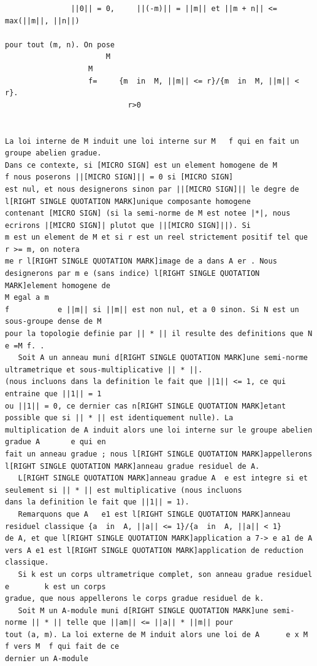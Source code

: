 \documentclass[
  11pt,
]{article}
\begin{document}
\begin{lstlisting}
               ||0|| = 0,     ||(-m)|| = ||m|| et ||m + n|| <= max(||m||, ||n||)

pour tout (m, n). On pose
                       M
                   M
                   f=     {m  in  M, ||m|| <= r}/{m  in  M, ||m|| < r}.
                            r>0


La loi interne de M induit une loi interne sur M   f qui en fait un groupe abelien gradue.
Dans ce contexte, si [MICRO SIGN] est un element homogene de M          f nous poserons ||[MICRO SIGN]|| = 0 si [MICRO SIGN]
est nul, et nous designerons sinon par ||[MICRO SIGN]|| le degre de l[RIGHT SINGLE QUOTATION MARK]unique composante homogene
contenant [MICRO SIGN] (si la semi-norme de M est notee |*|, nous ecrirons |[MICRO SIGN]| plutot que ||[MICRO SIGN]||). Si
m est un element de M et si r est un reel strictement positif tel que r >= m, on notera
me r l[RIGHT SINGLE QUOTATION MARK]image de a dans A er . Nous designerons par m e (sans indice) l[RIGHT SINGLE QUOTATION MARK]element homogene de
M egal a m
f           e ||m|| si ||m|| est non nul, et a 0 sinon. Si N est un sous-groupe dense de M
pour la topologie definie par || * || il resulte des definitions que N e =M f. .
   Soit A un anneau muni d[RIGHT SINGLE QUOTATION MARK]une semi-norme ultrametrique et sous-multiplicative || * ||.
(nous incluons dans la definition le fait que ||1|| <= 1, ce qui entraine que ||1|| = 1
ou ||1|| = 0, ce dernier cas n[RIGHT SINGLE QUOTATION MARK]etant possible que si || * || est identiquement nulle). La
multiplication de A induit alors une loi interne sur le groupe abelien gradue A       e qui en
fait un anneau gradue ; nous l[RIGHT SINGLE QUOTATION MARK]appellerons l[RIGHT SINGLE QUOTATION MARK]anneau gradue residuel de A.
   L[RIGHT SINGLE QUOTATION MARK]anneau gradue A  e est integre si et seulement si || * || est multiplicative (nous incluons
dans la definition le fait que ||1|| = 1).
   Remarquons que A   e1 est l[RIGHT SINGLE QUOTATION MARK]anneau residuel classique {a  in  A, ||a|| <= 1}/{a  in  A, ||a|| < 1}
de A, et que l[RIGHT SINGLE QUOTATION MARK]application a 7-> e a1 de A vers A e1 est l[RIGHT SINGLE QUOTATION MARK]application de reduction classique.
   Si k est un corps ultrametrique complet, son anneau gradue residuel e        k est un corps
gradue, que nous appellerons le corps gradue residuel de k.
   Soit M un A-module muni d[RIGHT SINGLE QUOTATION MARK]une semi-norme || * || telle que ||am|| <= ||a|| * ||m|| pour
tout (a, m). La loi externe de M induit alors une loi de A      e x M f vers M  f qui fait de ce
dernier un A-module

\end{lstlisting}
\end{document}
